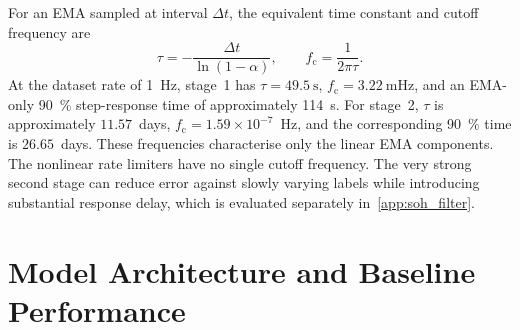 \documentclass[final,3p,times]{elsarticle}
\begin{document}
For an EMA sampled at interval $\Delta t$, the equivalent time constant and cutoff frequency are
\begin{equation}
    \tau=-\frac{\Delta t}{\ln(1-\alpha)},\qquad
    f_{\mathrm c}=\frac{1}{2\pi\tau}.
\end{equation}
At the dataset rate of \SI{1}{\hertz}, stage~1 has $\tau=\SI{49.5}{\second}$, $f_{\mathrm c}=\SI{3.22}{\milli\hertz}$, and an EMA-only 90~\% step-response time of approximately \SI{114}{\second}. For stage~2, $\tau$ is approximately $11.57$~days, $f_{\mathrm c}=1.59\times10^{-7}$~Hz, and the corresponding 90~\% time is $26.65$~days. These frequencies characterise only the linear EMA components. The nonlinear rate limiters have no single cutoff frequency. The very strong second stage can reduce error against slowly varying labels while introducing substantial response delay, which is evaluated separately in~\ref{app:soh_filter}.
\section{Model Architecture and Baseline Performance}
\end{document}
